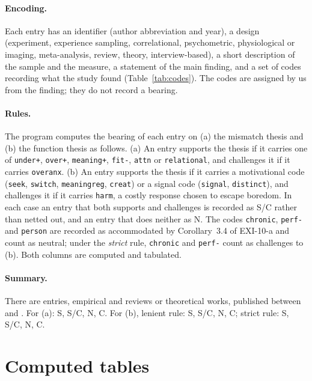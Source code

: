 \documentclass{situationist-preprint}
\begin{document}
\paragraph{Encoding.} Each entry has an identifier (author abbreviation and year), a design (experiment, experience sampling, correlational, psychometric, physiological or imaging, meta-analysis, review, theory, interview-based), a short description of the sample and the measure, a statement of the main finding, and a set of codes recording what the study found (Table~\ref{tab:codes}). The codes are assigned by us from the finding; they do not record a bearing.

\paragraph{Rules.} The program computes the bearing of each entry on (a) the mismatch thesis and (b) the function thesis as follows. (a) An entry supports the thesis if it carries one of \texttt{under+}, \texttt{over+}, \texttt{meaning+}, \texttt{fit-}, \texttt{attn} or \texttt{relational}, and challenges it if it carries \texttt{overanx}. (b) An entry supports the thesis if it carries a motivational code (\texttt{seek}, \texttt{switch}, \texttt{meaningreg}, \texttt{creat}) or a signal code (\texttt{signal}, \texttt{distinct}), and challenges it if it carries \texttt{harm}, a costly response chosen to escape boredom. In each case an entry that both supports and challenges is recorded as S/C rather than netted out, and an entry that does neither as N. The codes \texttt{chronic}, \texttt{perf-} and \texttt{person} are recorded as accommodated by Corollary~3.4 of EXI-10-a and count as neutral; under the \emph{strict} rule, \texttt{chronic} and \texttt{perf-} count as challenges to (b). Both columns are computed and tabulated.

\paragraph{Summary.} There are \stn{} entries, \stnemp{} empirical and \stntheo{} reviews or theoretical works, published between \stymin{} and \stymax{}. For (a): \staS{} S, \staSandC{} S/C, \staN{} N, \staC{} C. For (b), lenient rule: \stbS{} S, \stbSandC{} S/C, \stbN{} N, \stbC{} C; strict rule: \stbsS{} S, \stbsSandC{} S/C, \stbsN{} N, \stbsC{} C.



\section{Computed tables}\label{app:b}
\end{document}
